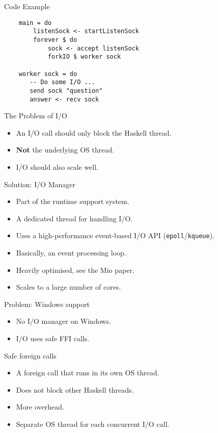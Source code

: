 \documentclass{beamer}
\begin{document}
\begin{frame}[fragile]{Code Example}
\begin{verbatim}
    main = do
        listenSock <- startListenSock
        forever $ do
            sock <- accept listenSock
            forkIO $ worker sock

    worker sock = do
       -- Do some I/O ...
       send sock "question"
       answer <- recv sock
\end{verbatim}
\end{frame}

\begin{frame}{The Problem of I/O}
  \begin{itemize}
  \item An I/O call should only block the Haskell thread.
  \item \textbf{Not} the underlying OS thread.
  \item I/O should also scale well.
  \end{itemize}
\end{frame}

\begin{frame}{Solution: I/O Manager}
  \begin{itemize}
  \item Part of the runtime support system.
  \item A dedicated thread for handling I/O.
  \item Uses a high-performance event-based I/O API (\texttt{epoll}/\texttt{kqueue}).
  \item Basically, an event processing loop.
  \item Heavily optimised, see the Mio paper.
  \item Scales to a large number of cores.
  \end{itemize}
\end{frame}

\begin{frame}{Problem: Windows support}
  \begin{itemize}
  \item No I/O manager on Windows.
  \item I/O uses safe FFI calls.
  \end{itemize}
\end{frame}

\begin{frame}{Safe foreign calls}
  \begin{itemize}
  \item A foreign call that runs in its own OS thread.
  \item Does not block other Haskell threads.
  \item More overhead.
  \item Separate OS thread for each concurrent I/O call.
  \end{itemize}
\end{frame}
\end{document}
